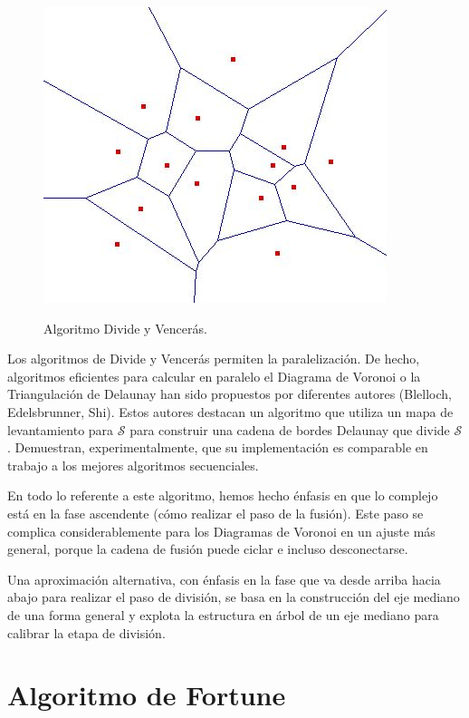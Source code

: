 \begin{figure}[H]
\begin{center}
{            \includegraphics[scale=0.4]{imagenes/paso4.JPG}
        }
    \end{center}
    \caption{Algoritmo Divide y Vencerás. \cite{fotosdividevenceras}} \label{fig:incre}
\end{figure}

Los algoritmos de Divide y Vencerás permiten la paralelización. De hecho, algoritmos eficientes para calcular en paralelo el Diagrama de Voronoi o la Triangulación de Delaunay han sido propuestos por diferentes autores (Blelloch, Edelsbrunner, Shi). Estos autores destacan un algoritmo que utiliza un mapa de levantamiento para $\mathcal{S}$ para construir una cadena de bordes Delaunay que divide $\mathcal{S}$. Demuestran, experimentalmente, que su implementación es comparable en trabajo a los mejores algoritmos secuenciales.
\vspace{0.3cm}

En todo lo referente a este algoritmo, hemos hecho énfasis en que lo complejo está en la fase ascendente (cómo realizar el paso de la fusión). Este paso se complica considerablemente para los Diagramas de Voronoi en un ajuste más general, porque la cadena de fusión puede ciclar e incluso desconectarse.
\vspace{0.3cm}

Una aproximación alternativa, con énfasis en la fase que va desde arriba hacia abajo para realizar el paso de división, se basa en la construcción del eje mediano de una forma general y explota la estructura en árbol de un eje mediano para calibrar la etapa de división.

\section{Algoritmo de Fortune}

